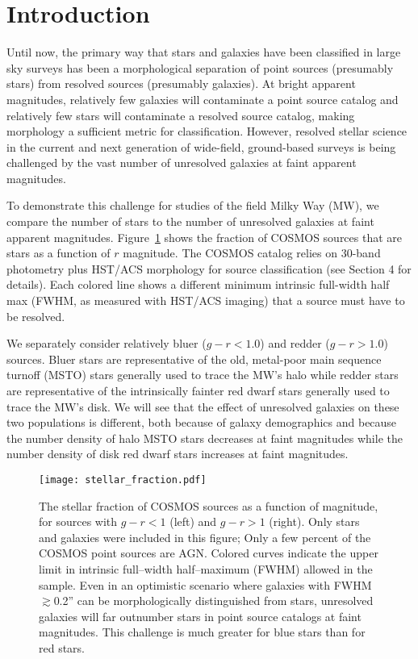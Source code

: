 \documentclass[12pt,preprint]{aastex}
\begin{document}
%
%
\section{Introduction}

Until now, the primary way that stars and galaxies have been
classified in large sky surveys has been a morphological separation
\citep[e.g.,][]{kron80,yee91,vasconcellos11a,henrion11a} of point
sources (presumably stars) from resolved sources (presumably
galaxies).  At bright apparent magnitudes, relatively few galaxies
will contaminate a point source catalog and relatively few stars will
contaminate a resolved source catalog, making morphology a sufficient
metric for classification.  However, resolved stellar science in the
current and next generation of wide-field, ground-based surveys is
being challenged by the vast number of unresolved galaxies at faint
apparent magnitudes.  

To demonstrate this challenge for studies of the field Milky Way (MW),
we compare the number of stars to the number of unresolved galaxies at
faint apparent magnitudes.  Figure~\ref{fig:stellarfraction} shows the
fraction of COSMOS sources that are stars as a function of $r$
magnitude.  The COSMOS catalog \citep[($l,b$) $\sim$ (237,43)
degrees][]{capak07a,scoville07b,ilbert09} relies on 30-band photometry
plus HST/ACS morphology for source classification (see Section 4 for
details).  Each colored line shows a different minimum intrinsic
full-width half max (FWHM, as measured with HST/ACS imaging) that a
source must have to be resolved.

We separately consider relatively bluer ($g-r < 1.0$) and redder ($g-r
> 1.0$) sources.  Bluer stars are representative of the old,
metal-poor main sequence turnoff (MSTO) stars generally used to trace
the MW's halo while redder stars are representative of the
intrinsically fainter red dwarf stars generally used to trace the MW's
disk.  We will see that the effect of unresolved galaxies on these two
populations is different, both because of galaxy demographics and
because the number density of halo MSTO stars decreases at faint
magnitudes while the number density of disk red dwarf stars increases at
faint magnitudes.

\begin{figure}
\centering
\texttt{[image: stellar\_fraction.pdf]}
\caption{The stellar fraction of COSMOS sources as a function of
  magnitude, for sources with $g-r<1$ (left) and $g-r>1$ (right).
  Only stars and galaxies were included in this figure; Only a few
  percent of the COSMOS point sources are AGN.  Colored curves
  indicate the upper limit in intrinsic full--width half--maximum
  (FWHM) allowed in the sample.  Even in an optimistic scenario where
  galaxies with FWHM $\gtrsim$0.2'' can be morphologically distinguished
  from stars, unresolved galaxies will far outnumber stars in point
  source catalogs at faint magnitudes.  This challenge is much greater
  for blue stars than for red stars.}
\label{fig:stellarfraction}
\end{figure}
 
\end{document}
